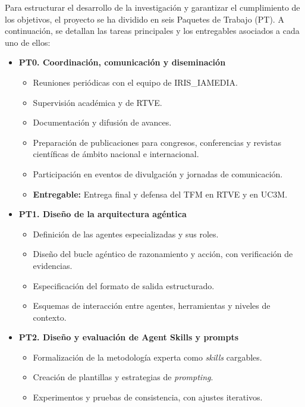
Para estructurar el desarrollo de la investigación y garantizar el cumplimiento de los objetivos, el proyecto se ha dividido en seis Paquetes de Trabajo (PT). A continuación, se detallan las tareas principales y los entregables asociados a cada uno de ellos:


\begin{itemize}
    \item \textbf{PT0. Coordinación, comunicación y diseminación}
    \begin{itemize}
        \item Reuniones periódicas con el equipo de IRIS\_IAMEDIA.
        \item Supervisión académica y de RTVE.
        \item Documentación y difusión de avances.
        \item Preparación de publicaciones para congresos, conferencias y revistas científicas de ámbito nacional e internacional.
        \item Participación en eventos de divulgación y jornadas de comunicación.
        \item \textbf{Entregable:} Entrega final y defensa del TFM en RTVE y en UC3M.
    \end{itemize}
    
    \item \textbf{PT1. Diseño de la arquitectura agéntica}
    \begin{itemize}
        \item Definición de las agentes especializadas y sus roles.
        \item Diseño del bucle agéntico de razonamiento y acción, con verificación de evidencias.
        \item Especificación del formato de salida estructurado.
        \item Esquemas de interacción entre agentes, herramientas y niveles de contexto.
    \end{itemize}
    
    \item \textbf{PT2. Diseño y evaluación de Agent Skills y prompts}
    \begin{itemize}
        \item Formalización de la metodología experta como \textit{skills} cargables.
        \item Creación de plantillas y estrategias de \textit{prompting}.
        \item Experimentos y pruebas de consistencia, con ajustes iterativos.
    \end{itemize}
    

\end{itemize}
